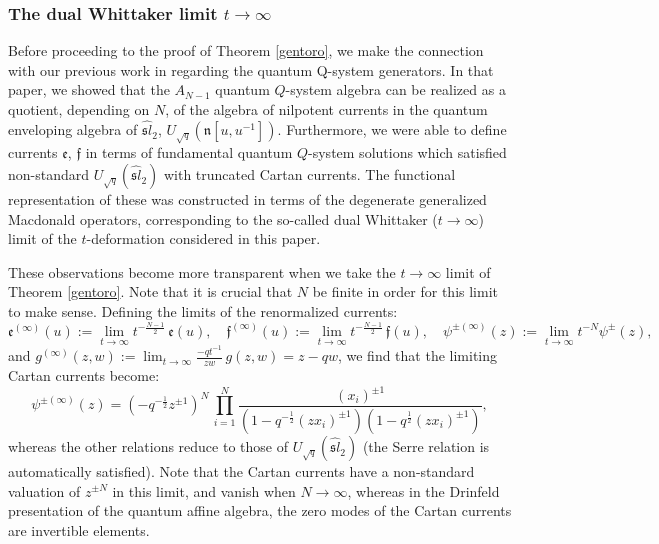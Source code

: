 \subsubsection{The dual Whittaker limit $t\to\infty$}
Before proceeding to the proof of Theorem \ref{gentoro}, we make the connection with our previous work in \cite{DFK16} regarding the quantum Q-system generators.
In that paper, we showed that the $A_{N-1}$ quantum $Q$-system algebra can be realized as a
quotient, depending on $N$, of the algebra of nilpotent currents in the quantum enveloping algebra of $\widehat{\mathfrak sl}_2$, 
$U_{\sqrt{q}}({\mathfrak n}[u,u^{-1}])$. Furthermore, we were able to define currents ${\mathfrak e}$, ${\mathfrak f}$
in terms of fundamental quantum $Q$-system solutions which satisfied non-standard $U_{\sqrt{q}}(\widehat{\mathfrak sl}_2)$
with truncated Cartan currents. The functional representation of these was constructed
in terms of the degenerate generalized Macdonald operators, corresponding to the so-called dual Whittaker
($t\to\infty$) limit of the $t$-deformation considered in this paper.

These observations become more transparent when we take the $t\to \infty$ limit of Theorem \ref{gentoro}.
Note that it is crucial that $N$ be finite in order for this limit to make sense. 
Defining the limits of the renormalized currents:
\begin{equation}
\label{limefpsi}
{\mathfrak e}^{(\infty)}(u):= \lim_{t\to\infty} t^{-\frac{N-1}{2}} \, {\mathfrak e}(u),\quad {\mathfrak f}^{(\infty)}(u):= \lim_{t\to\infty} t^{-\frac{N-1}{2}} \, {\mathfrak f}(u), \quad \psi^{\pm(\infty)}(z):= \lim_{t\to\infty} t^{-N} \psi^{\pm}(z),
\end{equation}
and $g^{(\infty)}(z,w):=\lim_{t\to\infty} \frac{-qt^{-1}}{z w}\, g(z,w)= z-q w$, we find that the limiting Cartan currents become:
\begin{equation}\label{psilim}
\psi^{\pm(\infty)}(z)=(-q^{-\frac{1}{2}}z^{\pm 1})^N\, \prod_{i=1}^{N} 
\frac{(x_i)^{\pm 1}}{(1-q^{-\frac{1}{2}} (z x_i)^{\pm 1})(1-q^{\frac{1}{2}} (z x_i)^{\pm 1})}  ,
\end{equation}
whereas the other relations reduce to those of $U_{\sqrt{q}}(\widehat{\mathfrak sl}_2)$ (the Serre relation is 
automatically satisfied). Note that the Cartan currents have a non-standard valuation of $z^{\pm N}$ in this limit, and vanish when $N\to\infty$, whereas in the Drinfeld presentation of the quantum affine algebra, the zero modes of the Cartan currents are invertible elements.



